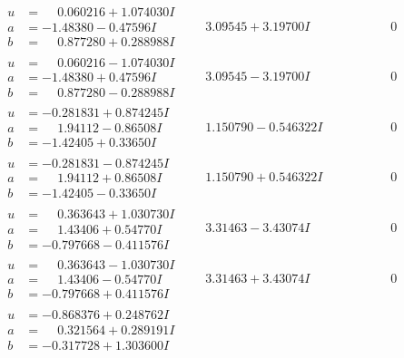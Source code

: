 \documentclass[1p]{elsarticle_modified}
\theoremstyle{definition}
\begin{document}
$$\begin{array}{c|c|c}
\begin{aligned}
u &= \phantom{-}0.060216 + 1.074030 I \\
a &= -1.48380 - 0.47596 I \\
b &= \phantom{-}0.877280 + 0.288988 I\end{aligned}
 & \phantom{-}3.09545 + 3.19700 I & \phantom{-0.000000 } 0 \\ \hline\begin{aligned}
u &= \phantom{-}0.060216 - 1.074030 I \\
a &= -1.48380 + 0.47596 I \\
b &= \phantom{-}0.877280 - 0.288988 I\end{aligned}
 & \phantom{-}3.09545 - 3.19700 I & \phantom{-0.000000 } 0 \\ \hline\begin{aligned}
u &= -0.281831 + 0.874245 I \\
a &= \phantom{-}1.94112 - 0.86508 I \\
b &= -1.42405 + 0.33650 I\end{aligned}
 & \phantom{-}1.150790 - 0.546322 I & \phantom{-0.000000 } 0 \\ \hline\begin{aligned}
u &= -0.281831 - 0.874245 I \\
a &= \phantom{-}1.94112 + 0.86508 I \\
b &= -1.42405 - 0.33650 I\end{aligned}
 & \phantom{-}1.150790 + 0.546322 I & \phantom{-0.000000 } 0 \\ \hline\begin{aligned}
u &= \phantom{-}0.363643 + 1.030730 I \\
a &= \phantom{-}1.43406 + 0.54770 I \\
b &= -0.797668 - 0.411576 I\end{aligned}
 & \phantom{-}3.31463 - 3.43074 I & \phantom{-0.000000 } 0 \\ \hline\begin{aligned}
u &= \phantom{-}0.363643 - 1.030730 I \\
a &= \phantom{-}1.43406 - 0.54770 I \\
b &= -0.797668 + 0.411576 I\end{aligned}
 & \phantom{-}3.31463 + 3.43074 I & \phantom{-0.000000 } 0 \\ \hline\begin{aligned}
u &= -0.868376 + 0.248762 I \\
a &= \phantom{-}0.321564 + 0.289191 I \\
b &= -0.317728 + 1.303600 I\end{aligned}

\end{array}$$
\end{document}
